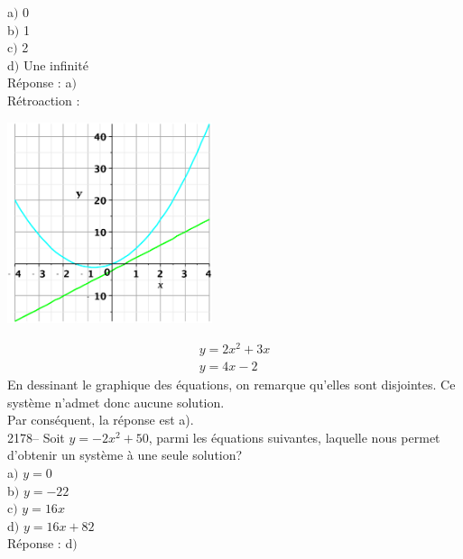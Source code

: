\documentclass[letterpaper, 12pt]{article}
\begin{document}
a$)$ 0\\
b$)$ 1\\
c$)$ 2\\
d$)$ Une infinit\'e\\

R\'eponse : a$)$\\

R\'etroaction :\\
\begin{center}
 \includegraphics[width=6cm,bb=20 118 575 673]{Q2177.eps}
\end{center}
\begin{eqnarray*}
 y=2x^{2}+3x\\
y=4x-2
\end{eqnarray*}
En dessinant le graphique des \'equations, on remarque qu'elles sont disjointes. Ce syst\`eme n'admet donc aucune solution.\\
Par cons\'equent, la r\'eponse est a).\\

2178-- Soit $y=-2x^{2}+50$, parmi les \'equations suivantes, laquelle nous permet d'obtenir un syst\`eme \`a une seule solution? \\

a$)$ $y=0$\\
b$)$ $y=-22$\\
c$)$ $y=16x$\\
d$)$ $y=16x+82$\\

R\'eponse : d$)$\\
\end{document}
